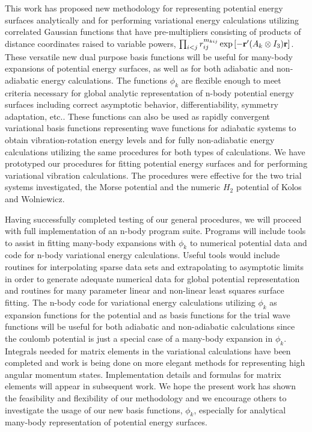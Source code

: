This work has proposed new methodology for representing potential energy
surfaces analytically and for performing variational energy calculations
utilizing correlated Gaussian functions that have pre-multipliers consisting
of products of distance coordinates raised to variable powers, $%
\prod_{i<j}r_{ij}^{m_{kij}}\exp \left[ -{\bf r}^{\prime }(A_k\otimes I_3)%
{\bf r}\right] $. These versatile new dual purpose basis functions will be
useful for many-body expansions of potential energy surfaces, as well as for
both adiabatic and non-adiabatic energy calculations. The functions $\phi _k$
are flexible enough to meet criteria necessary for global analytic
representation of n-body potential energy surfaces including correct
asymptotic behavior, differentiability, symmetry adaptation, etc.. These
functions can also be used as rapidly convergent variational basis functions
representing wave functions for adiabatic systems to obtain
vibration-rotation energy levels and for fully non-adiabatic energy
calculations utilizing the same procedures for both types of calculations.
We have prototyped our procedures for fitting potential energy surfaces and
for performing variational vibration calculations. The procedures were
effective for the two trial systems investigated, the Morse potential and
the numeric $H_2$ potential of Kolos and Wolniewicz\cite{Kolos65}.

Having successfully completed testing of our general procedures, we will
proceed with full implementation of an n-body program suite. Programs will
include tools to assist in fitting many-body expansions with $\phi _k$ to
numerical potential data and code for n-body variational energy
calculations. Useful tools would include routines for interpolating sparse
data sets and extrapolating to asymptotic limits in order to generate
adequate numerical data for global potential representation and routines for
many parameter linear and non-linear least squares surface fitting. The
n-body code for variational energy calculations utilizing $\phi _k$ as
expansion functions for the potential and as basis functions for the trial
wave functions will be useful for both adiabatic and non-adiabatic
calculations since the coulomb potential is just a special case of a
many-body expansion in $\phi _k$. Integrals needed for matrix elements in
the variational calculations have been completed and work is being done on
more elegant methods for representing high angular momentum states.
Implementation details and formulas for matrix elements will appear in
subsequent work. We hope the present work has shown the feasibility and
flexibility of our methodology and we encourage others to investigate the
usage of our new basis functions, $\phi _k$, especially for analytical
many-body representation of potential energy surfaces.





